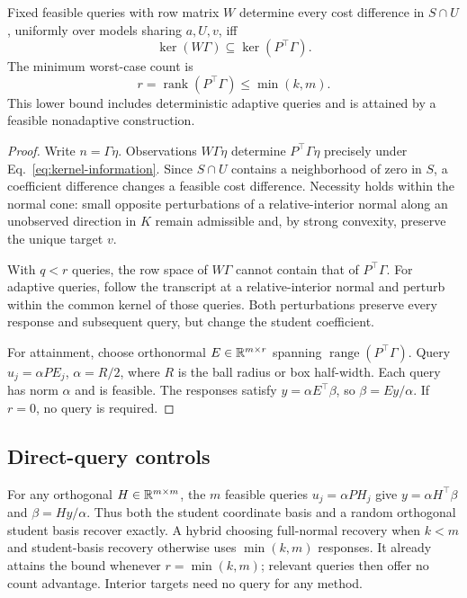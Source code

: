 \begin{proposition}\label{prop:minimal-information}
Fixed feasible queries with row matrix $W$ determine every cost
difference in $S\cap U$, uniformly over models sharing $a,U,v$, iff
\begin{equation}\label{eq:kernel-information}
 \ker(W\Gamma)\subseteq\ker(P^\top\Gamma).
\end{equation}
The minimum worst-case count is
\begin{equation}\label{eq:information-rank}
 r=\operatorname{rank}(P^\top\Gamma)\leq\min(k,m).
\end{equation}
This lower bound includes deterministic adaptive queries and is attained
by a feasible nonadaptive construction.
\end{proposition}
\begin{proof}
Write $n=\Gamma\eta$. Observations $W\Gamma\eta$ determine
$P^\top\Gamma\eta$ precisely under Eq.~\eqref{eq:kernel-information}.
Since $S\cap U$ contains a neighborhood of zero in $S$, a coefficient
difference changes a feasible cost difference. Necessity holds within
the normal cone: small opposite perturbations of a relative-interior
normal along an unobserved direction in $K$ remain admissible and,
by strong convexity, preserve the unique target $v$.

With $q<r$ queries, the row space of $W\Gamma$ cannot contain that
of $P^\top\Gamma$. For adaptive queries, follow the transcript at a
relative-interior normal and perturb within the common kernel of those
queries. Both perturbations preserve every response and subsequent
query, but change the student coefficient.

For attainment, choose orthonormal $E\in\mathbb R^{m\times r}$ spanning
$\operatorname{range}(P^\top\Gamma)$. Query $u_j=\alpha PE_j$,
$\alpha=R/2$, where $R$ is the ball radius or box half-width. Each
query has norm $\alpha$ and is feasible. The responses satisfy
$y=\alpha E^\top\beta$, so $\beta=Ey/\alpha$. If $r=0$, no query
is required.
\end{proof}

\subsection{Direct-query controls}
For any orthogonal $H\in\mathbb R^{m\times m}$, the $m$ feasible queries
$u_j=\alpha PH_j$ give $y=\alpha H^\top\beta$ and
$\beta=Hy/\alpha$. Thus both the student coordinate basis and a random
orthogonal student basis recover exactly. A hybrid choosing full-normal
recovery when $k<m$ and student-basis recovery otherwise uses
$\min(k,m)$ responses. It already attains the bound whenever
$r=\min(k,m)$; relevant queries then offer no count advantage.
Interior targets need no query for any method.

